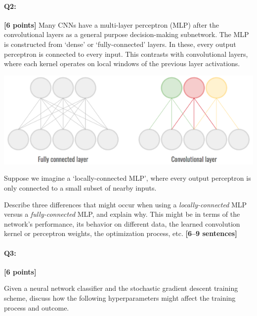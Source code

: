 \pagebreak
\paragraph{Q2:} \textbf{[6 points]} Many CNNs have a multi-layer perceptron (MLP) after the convolutional layers as a general purpose decision-making subnetwork. The MLP is constructed from `dense' or `fully-connected' layers. In these, every output perceptron is connected to every input. This contrasts with convolutional layers, where each kernel operates on local windows of the previous layer activations.

\includegraphics[width=\linewidth]{images/q2mlp.png}

Suppose we imagine a `locally-connected MLP', where every output perceptron is only connected to a small subset of nearby inputs.

\begin{tcolorbox}[colback=orange!5!white,colframe=orange!75!black]
Describe three differences that might occur when using a \emph{locally-connected} MLP versus a \emph{fully-connected} MLP, and explain why.
This might be in terms of the network's performance, its behavior on different data, the learned convolution kernel or perceptron weights, the optimization process, etc. \textbf{[6--9 sentences]}
\end{tcolorbox}



\pagebreak
\paragraph{Q3:} \textbf{[6 points]} 
\begin{tcolorbox}[colback=orange!5!white,colframe=orange!75!black]
Given a neural network classifier and the stochastic gradient descent training scheme, discuss how the following hyperparameters might affect the training process and outcome.
\end{tcolorbox}

